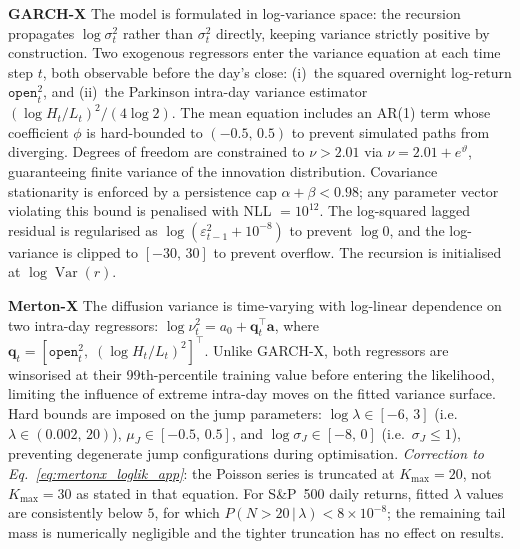 \textbf{GARCH-X} \quad
The model is formulated in log-variance space: the recursion propagates
$\log\sigma_t^2$ rather than $\sigma_t^2$ directly, keeping variance
strictly positive by construction.
Two exogenous regressors enter the variance equation at each time step $t$,
both observable before the day's close: (i)~the squared overnight
log-return $\texttt{open}_t^2$, and (ii)~the Parkinson intra-day variance
estimator $(\log H_t/L_t)^2/(4\log 2)$.
The mean equation includes an AR(1) term whose coefficient $\phi$ is
hard-bounded to $(-0.5,\,0.5)$ to prevent simulated paths from diverging.
Degrees of freedom are constrained to $\nu > 2.01$ via
$\nu = 2.01 + e^{\vartheta}$, guaranteeing finite variance of the
innovation distribution.
Covariance stationarity is enforced by a persistence cap
$\alpha + \beta < 0.98$; any parameter vector violating this bound is
penalised with NLL $= 10^{12}$.
The log-squared lagged residual is regularised as
$\log(\varepsilon_{t-1}^2 + 10^{-8})$ to prevent $\log 0$, and the
log-variance is clipped to $[-30,\, 30]$ to prevent overflow.
The recursion is initialised at $\log\operatorname{Var}(r)$.

\textbf{Merton-X} \quad
The diffusion variance is time-varying with log-linear dependence on
two intra-day regressors: $\log\nu_t^2 = a_0 + \mathbf{q}_t^\top\mathbf{a}$,
where $\mathbf{q}_t = [\texttt{open}_t^2,\;(\log H_t/L_t)^2]^\top$.
Unlike GARCH-X, both regressors are winsorised at their 99th-percentile
training value before entering the likelihood, limiting the influence of
extreme intra-day moves on the fitted variance surface.
Hard bounds are imposed on the jump parameters:
$\log\lambda \in [-6,\,3]$ (i.e.\ $\lambda \in (0.002,\,20)$),
$\mu_J \in [-0.5,\,0.5]$, and $\log\sigma_J \in [-8,\,0]$
(i.e.\ $\sigma_J \leq 1$), preventing degenerate jump configurations
during optimisation.
\textit{Correction to Eq.\ \ref{eq:mertonx_loglik_app}}: the Poisson
series is truncated at $K_{\max} = 20$, not $K_{\max} = 30$ as stated
in that equation. For S\&P~500 daily returns, fitted $\lambda$ values
are consistently below $5$, for which $P(N > 20\,|\,\lambda) < 8\times
10^{-8}$; the remaining tail mass is numerically negligible and the
tighter truncation has no effect on results.
